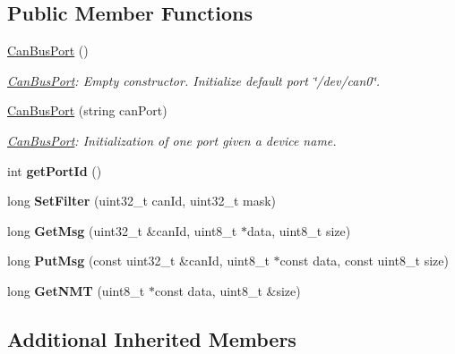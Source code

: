 \subsection*{Public Member Functions}
\begin{DoxyCompactItemize}
\item 
\mbox{\label{classCanBusPort_a4ccb8d39da6185bfe5c1dee38db51987}} 
\hyperlink{classCanBusPort_a4ccb8d39da6185bfe5c1dee38db51987}{Can\+Bus\+Port} ()
\begin{DoxyCompactList}\small\item\em \hyperlink{classCanBusPort}{Can\+Bus\+Port}\+: Empty constructor. Initialize default port \char`\"{}/dev/can0\char`\"{}. \end{DoxyCompactList}\item 
\hyperlink{classCanBusPort_ad4649a2da594bbffc267483646fb1405}{Can\+Bus\+Port} (string can\+Port)
\begin{DoxyCompactList}\small\item\em \hyperlink{classCanBusPort}{Can\+Bus\+Port}\+: Initialization of one port given a device name. \end{DoxyCompactList}\item 
\mbox{\label{classCanBusPort_a7c6b733c5834d4ab3e1906d847a2234a}} 
int {\bfseries get\+Port\+Id} ()
\item 
\mbox{\label{classCanBusPort_af09c794e3af86e89c8a511535f856dc9}} 
long {\bfseries Set\+Filter} (uint32\+\_\+t can\+Id, uint32\+\_\+t mask)
\item 
\mbox{\label{classCanBusPort_a13d6b06d93debc20b2f49aa8e7139988}} 
long {\bfseries Get\+Msg} (uint32\+\_\+t \&can\+Id, uint8\+\_\+t $\ast$data, uint8\+\_\+t size)
\item 
\mbox{\label{classCanBusPort_a2bb802ad7a14e260f0f51b79d4c53c43}} 
long {\bfseries Put\+Msg} (const uint32\+\_\+t \&can\+Id, uint8\+\_\+t $\ast$const data, const uint8\+\_\+t size)
\item 
\mbox{\label{classCanBusPort_a41242dc7980ca398e4770813e50ef32b}} 
long {\bfseries Get\+N\+MT} (uint8\+\_\+t $\ast$const data, uint8\+\_\+t \&size)
\end{DoxyCompactItemize}
\subsection*{Additional Inherited Members}


